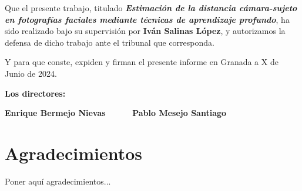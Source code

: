 Que el presente trabajo, titulado \textit{\textbf{Estimación de la distancia cámara-sujeto en fotografías faciales mediante técnicas de aprendizaje profundo}}, ha sido realizado bajo su supervisión por \textbf{Iván Salinas López}, y autorizamos la defensa de dicho trabajo ante el tribunal
que corresponda.

\vspace{0.5cm}

Y para que conste, expiden y firman el presente informe en Granada a X de Junio de 2024.

\vspace{1cm}

\textbf{Los directores:}

\vspace{5cm}

\noindent \textbf{Enrique Bermejo Nievas \ \ \ \ \ Pablo Mesejo Santiago}

\chapter*{Agradecimientos}
\thispagestyle{empty}

       \vspace{1cm}


Poner aquí agradecimientos...

